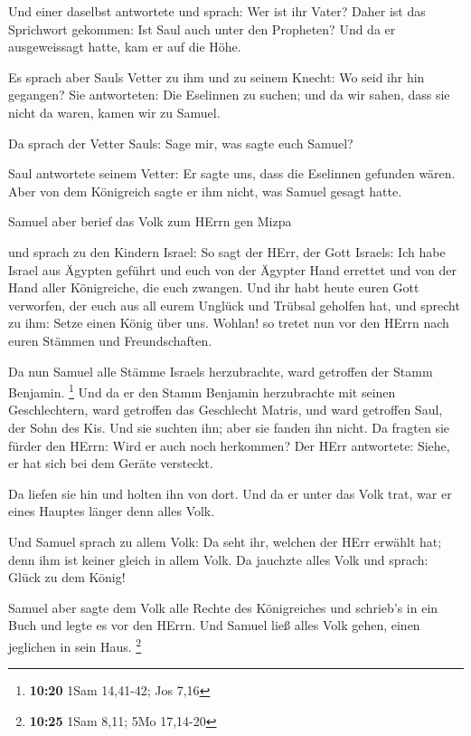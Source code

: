  Und einer daselbst antwortete und sprach: Wer ist ihr
Vater? Daher ist das Sprichwort gekommen: Ist Saul auch unter den
Propheten?  Und da er ausgeweissagt hatte, kam er auf die
Höhe.

 Es sprach aber Sauls Vetter zu ihm und zu seinem Knecht:
Wo seid ihr hin gegangen? Sie antworteten: Die Eselinnen zu suchen; und
da wir sahen, dass sie nicht da waren, kamen wir zu Samuel.

 Da sprach der Vetter Sauls: Sage mir, was sagte euch
Samuel?

 Saul antwortete seinem Vetter: Er sagte uns, dass die
Eselinnen gefunden wären. Aber von dem Königreich sagte er ihm nicht,
was Samuel gesagt hatte.

 Samuel aber berief das Volk zum HErrn gen Mizpa

 und sprach zu den Kindern Israel: So sagt der HErr, der
Gott Israels: Ich habe Israel aus Ägypten geführt und euch von der
Ägypter Hand errettet und von der Hand aller Königreiche, die euch
zwangen.  Und ihr habt heute euren Gott verworfen, der euch
aus all eurem Unglück und Trübsal geholfen hat, und sprecht zu ihm:
Setze einen König über uns. Wohlan! so tretet nun vor den HErrn nach
euren Stämmen und Freundschaften.

 Da nun Samuel alle Stämme Israels herzubrachte, ward
getroffen der Stamm Benjamin. \footnote{\textbf{10:20} 1Sam 14,41-42;
  Jos 7,16}  Und da er den Stamm Benjamin herzubrachte mit
seinen Geschlechtern, ward getroffen das Geschlecht Matris, und ward
getroffen Saul, der Sohn des Kis. Und sie suchten ihn; aber sie fanden
ihn nicht.  Da fragten sie fürder den HErrn: Wird er auch
noch herkommen? Der HErr antwortete: Siehe, er hat sich bei dem Geräte
versteckt.

 Da liefen sie hin und holten ihn von dort. Und da er unter
das Volk trat, war er eines Hauptes länger denn alles Volk.

 Und Samuel sprach zu allem Volk: Da seht ihr, welchen der
HErr erwählt hat; denn ihm ist keiner gleich in allem Volk. Da jauchzte
alles Volk und sprach: Glück zu dem König!

 Samuel aber sagte dem Volk alle Rechte des Königreiches
und schrieb's in ein Buch und legte es vor den HErrn. Und Samuel ließ
alles Volk gehen, einen jeglichen in sein Haus. \footnote{\textbf{10:25}
  1Sam 8,11; 5Mo 17,14-20}

